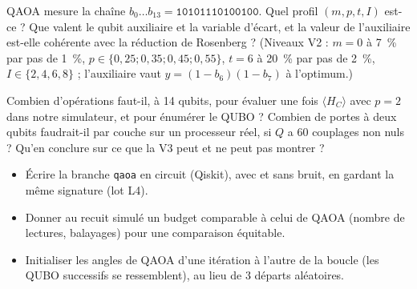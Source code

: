 \exercices
\begin{exercice}
QAOA mesure la chaîne $b_0\dots b_{13}=\texttt{10101110100100}$. Quel profil $(m,p,t,I)$ est-ce ? Que valent le qubit auxiliaire et la variable d'écart, et la valeur de l'auxiliaire est-elle cohérente avec la réduction de Rosenberg ? (Niveaux V2 : $m=0$ à 7~\% par pas de 1~\%, $p\in\{0{,}25;0{,}35;0{,}45;0{,}55\}$, $t=6$ à 20~\% par pas de 2~\%, $I\in\{2,4,6,8\}$ ; l'auxiliaire vaut $y=(1-b_6)(1-b_7)$ à l'optimum.)
\end{exercice}

\begin{exercice}
Combien d'opérations faut-il, à 14 qubits, pour évaluer une fois $\langle H_C\rangle$ avec $p=2$ dans notre simulateur, et pour énumérer le QUBO ? Combien de portes à deux qubits faudrait-il par couche sur un processeur réel, si $Q$ a 60 couplages non nuls ? Qu'en conclure sur ce que la V3 peut et ne peut pas montrer ?
\end{exercice}

\begin{pistes}
\begin{itemize}
\item Écrire la branche \texttt{qaoa} en circuit (Qiskit), avec et sans bruit, en gardant la même signature (lot L4).
\item Donner au recuit simulé un budget comparable à celui de QAOA (nombre de lectures, balayages) pour une comparaison équitable.
\item Initialiser les angles de QAOA d'une itération à l'autre de la boucle (les QUBO successifs se ressemblent), au lieu de 3 départs aléatoires.
\end{itemize}
\end{pistes}
